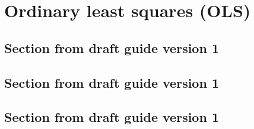 %
%
%
\section{Ordinary least squares (OLS)}

	\subsection{Section from draft guide version 1}

	\subsection{Section from draft guide version 1}

	\subsection{Section from draft guide version 1}